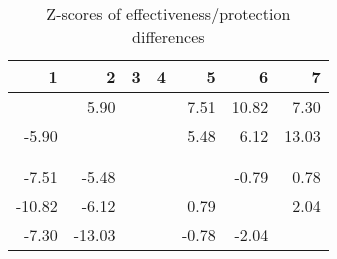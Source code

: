 \begin{table}[ht]
\centering
\begin{tabular}{rrrrrrr}
  \hline
1 & 2 & 3 & 4 & 5 & 6 & 7 \\ 
  \hline
 & 5.90 &  &  & 7.51 & 10.82 & 7.30 \\ 
  -5.90 &  &  &  & 5.48 & 6.12 & 13.03 \\ 
   &  &  &  &  &  &  \\ 
   &  &  &  &  &  &  \\ 
  -7.51 & -5.48 &  &  &  & -0.79 & 0.78 \\ 
  -10.82 & -6.12 &  &  & 0.79 &  & 2.04 \\ 
  -7.30 & -13.03 &  &  & -0.78 & -2.04 &  \\ 
   \hline
\end{tabular}
\caption{Z-scores of effectiveness/protection differences} 
\end{table}
